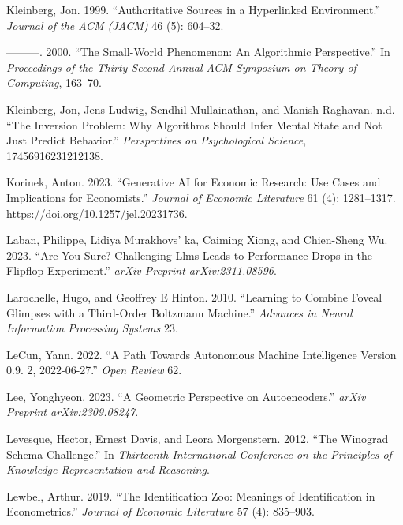 \documentclass[
]{article}
\newlength{\cslhangindent}
\newenvironment{CSLReferences}[2] %
 {\begin{list}{}{%
  \setlength{\itemindent}{0pt}
  \setlength{\leftmargin}{0pt}
  \setlength{\parsep}{0pt}
  \ifodd #1
   \setlength{\leftmargin}{\cslhangindent}
   \setlength{\itemindent}{-1\cslhangindent}
  \fi
  \setlength{\itemsep}{#2\baselineskip}}}
 {\end{list}}
\begin{document}
\begin{CSLReferences}{1}{0}
Kleinberg, Jon. 1999. {``Authoritative Sources in a Hyperlinked
Environment.''} \emph{Journal of the ACM (JACM)} 46 (5): 604--32.

---------. 2000. {``The Small-World Phenomenon: An Algorithmic
Perspective.''} In \emph{Proceedings of the Thirty-Second Annual ACM
Symposium on Theory of Computing}, 163--70.

Kleinberg, Jon, Jens Ludwig, Sendhil Mullainathan, and Manish Raghavan.
n.d. {``The Inversion Problem: Why Algorithms Should Infer Mental State
and Not Just Predict Behavior.''} \emph{Perspectives on Psychological
Science}, 17456916231212138.

Korinek, Anton. 2023. {``Generative AI for Economic Research: Use Cases
and Implications for Economists.''} \emph{Journal of Economic
Literature} 61 (4): 1281--1317.
\url{https://doi.org/10.1257/jel.20231736}.

Laban, Philippe, Lidiya Murakhovs' ka, Caiming Xiong, and Chien-Sheng
Wu. 2023. {``Are You Sure? Challenging Llms Leads to Performance Drops
in the Flipflop Experiment.''} \emph{arXiv Preprint arXiv:2311.08596}.

Larochelle, Hugo, and Geoffrey E Hinton. 2010. {``Learning to Combine
Foveal Glimpses with a Third-Order Boltzmann Machine.''} \emph{Advances
in Neural Information Processing Systems} 23.

LeCun, Yann. 2022. {``A Path Towards Autonomous Machine Intelligence
Version 0.9. 2, 2022-06-27.''} \emph{Open Review} 62.

Lee, Yonghyeon. 2023. {``A Geometric Perspective on Autoencoders.''}
\emph{arXiv Preprint arXiv:2309.08247}.

Levesque, Hector, Ernest Davis, and Leora Morgenstern. 2012. {``The
Winograd Schema Challenge.''} In \emph{Thirteenth International
Conference on the Principles of Knowledge Representation and Reasoning}.

Lewbel, Arthur. 2019. {``The Identification Zoo: Meanings of
Identification in Econometrics.''} \emph{Journal of Economic Literature}
57 (4): 835--903.


\end{CSLReferences}
\end{document}
